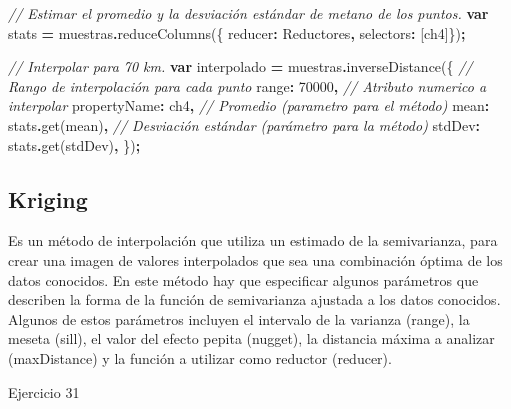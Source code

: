 \documentclass[
  12pt,
  letterpaper,
  twoside]{book}
\newenvironment{Shaded}{\begin{snugshade}}{\end{snugshade}}
\newcommand{\CommentTok}[1]{\textcolor[rgb]{0.56,0.35,0.01}{\textit{#1}}}
\newcommand{\DataTypeTok}[1]{\textcolor[rgb]{0.13,0.29,0.53}{#1}}
\newcommand{\DecValTok}[1]{\textcolor[rgb]{0.00,0.00,0.81}{#1}}
\newcommand{\FunctionTok}[1]{\textcolor[rgb]{0.00,0.00,0.00}{#1}}
\newcommand{\KeywordTok}[1]{\textcolor[rgb]{0.13,0.29,0.53}{\textbf{#1}}}
\newcommand{\NormalTok}[1]{#1}
\newcommand{\OperatorTok}[1]{\textcolor[rgb]{0.81,0.36,0.00}{\textbf{#1}}}
\newcommand{\StringTok}[1]{\textcolor[rgb]{0.31,0.60,0.02}{#1}}
\begin{document}
\begin{Shaded}
\begin{Highlighting}[]
\CommentTok{// Estimar el promedio y la desviación estándar de metano de los puntos.}
\KeywordTok{var}\NormalTok{ stats }\OperatorTok{=}\NormalTok{ muestras}\OperatorTok{.}\FunctionTok{reduceColumns}\NormalTok{(\{}
  \DataTypeTok{reducer}\OperatorTok{:}\NormalTok{ Reductores}\OperatorTok{,}
  \DataTypeTok{selectors}\OperatorTok{:}\NormalTok{ [}\StringTok{\textquotesingle{}ch4\textquotesingle{}}\NormalTok{]\})}\OperatorTok{;}

\CommentTok{// Interpolar para 70 km.}
\KeywordTok{var}\NormalTok{ interpolado }\OperatorTok{=}\NormalTok{ muestras}\OperatorTok{.}\FunctionTok{inverseDistance}\NormalTok{(\{}
  \CommentTok{// Rango de interpolación para cada punto}
  \DataTypeTok{range}\OperatorTok{:} \DecValTok{70000}\OperatorTok{,} 
  \CommentTok{// Atributo numerico a interpolar}
  \DataTypeTok{propertyName}\OperatorTok{:} \StringTok{\textquotesingle{}ch4\textquotesingle{}}\OperatorTok{,} 
  \CommentTok{// Promedio (parametro para el método)}
  \DataTypeTok{mean}\OperatorTok{:}\NormalTok{ stats}\OperatorTok{.}\FunctionTok{get}\NormalTok{(}\StringTok{\textquotesingle{}mean\textquotesingle{}}\NormalTok{)}\OperatorTok{,} 
  \CommentTok{// Desviación estándar (parámetro para la método)}
  \DataTypeTok{stdDev}\OperatorTok{:}\NormalTok{ stats}\OperatorTok{.}\FunctionTok{get}\NormalTok{(}\StringTok{\textquotesingle{}stdDev\textquotesingle{}}\NormalTok{)}\OperatorTok{,} 
\NormalTok{  \})}\OperatorTok{;} 
\end{Highlighting}
\end{Shaded}

\hypertarget{kriging}{%
\subsection*{Kriging}\label{kriging}}

Es un método de interpolación que utiliza un estimado de la semivarianza, para crear una imagen de valores interpolados que sea una combinación óptima de los datos conocidos. En este método hay que especificar algunos parámetros que describen la forma de la función de semivarianza ajustada a los datos conocidos. Algunos de estos parámetros incluyen el intervalo de la varianza (range), la meseta (sill), el valor del efecto pepita (nugget), la distancia máxima a analizar (maxDistance) y la función a utilizar como reductor (reducer).

Ejercicio 31
\end{document}
